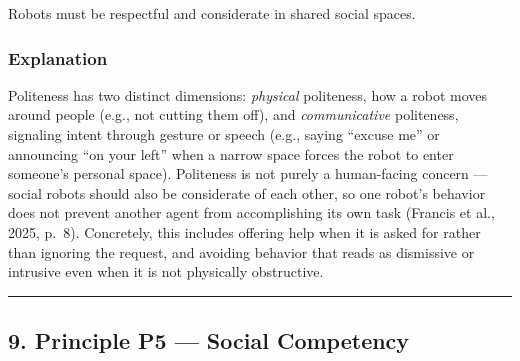 \documentclass[utf8]{frontiers_suppmat} %
\newenvironment{Shaded}{\begin{shaded}}{\end{shaded}}
\begin{document}
Robots must be respectful and considerate in shared social spaces.

\subsubsection{Explanation}\label{explanation-4}

Politeness has two distinct dimensions: \emph{physical} politeness, how
a robot moves around people (e.g., not cutting them off), and
\emph{communicative} politeness, signaling intent through gesture or
speech (e.g., saying ``excuse me'' or announcing ``on your left'' when a
narrow space forces the robot to enter someone's personal space).
Politeness is not purely a human-facing concern --- social robots should
also be considerate of each other, so one robot's behavior does not
prevent another agent from accomplishing its own task (Francis et al.,
2025, p.~8). Concretely, this includes offering help when it is asked
for rather than ignoring the request, and avoiding behavior that reads
as dismissive or intrusive even when it is not physically obstructive.

\begin{Shaded}
\begin{Highlighting}[]
\KeywordTok{:}
\KeywordTok{:}
\KeywordTok{:}
\KeywordTok{: }\CharTok{\textgreater{}}
\KeywordTok{:}
\AttributeTok{  }\KeywordTok{:}
\AttributeTok{    }\KeywordTok{{-}}\AttributeTok{ }
\AttributeTok{    }\KeywordTok{{-}}\AttributeTok{ }
\AttributeTok{  }\KeywordTok{:}
\AttributeTok{    }\KeywordTok{{-}}\AttributeTok{ }
\AttributeTok{    }\KeywordTok{{-}}\AttributeTok{ }
\end{Highlighting}
\end{Shaded}

\begin{center}\rule{0.5\linewidth}{0.5pt}\end{center}

\subsection{9. Principle P5 --- Social
Competency}\label{principle-p5-social-competency}
\end{document}
